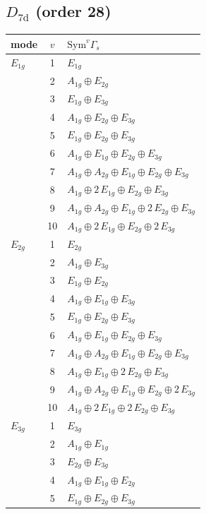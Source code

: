 \documentclass[11pt]{article}
\begin{document}
\subsection*{$D_{7\mathrm{d}}$ \quad (order 28)}
\begin{longtable}{l c p{}}
\hline mode & $v$ & $\mathrm{Sym}^v\Gamma_s$\\ \hline\endhead
$E_{1g}$ & 1 & $E_{1g}$\\
 & 2 & $A_{1g}\oplus E_{2g}$\\
 & 3 & $E_{1g}\oplus E_{3g}$\\
 & 4 & $A_{1g}\oplus E_{2g}\oplus E_{3g}$\\
 & 5 & $E_{1g}\oplus E_{2g}\oplus E_{3g}$\\
 & 6 & $A_{1g}\oplus E_{1g}\oplus E_{2g}\oplus E_{3g}$\\
 & 7 & $A_{1g}\oplus A_{2g}\oplus E_{1g}\oplus E_{2g}\oplus E_{3g}$\\
 & 8 & $A_{1g}\oplus 2\,E_{1g}\oplus E_{2g}\oplus E_{3g}$\\
 & 9 & $A_{1g}\oplus A_{2g}\oplus E_{1g}\oplus 2\,E_{2g}\oplus E_{3g}$\\
 & 10 & $A_{1g}\oplus 2\,E_{1g}\oplus E_{2g}\oplus 2\,E_{3g}$\\
\hline
$E_{2g}$ & 1 & $E_{2g}$\\
 & 2 & $A_{1g}\oplus E_{3g}$\\
 & 3 & $E_{1g}\oplus E_{2g}$\\
 & 4 & $A_{1g}\oplus E_{1g}\oplus E_{3g}$\\
 & 5 & $E_{1g}\oplus E_{2g}\oplus E_{3g}$\\
 & 6 & $A_{1g}\oplus E_{1g}\oplus E_{2g}\oplus E_{3g}$\\
 & 7 & $A_{1g}\oplus A_{2g}\oplus E_{1g}\oplus E_{2g}\oplus E_{3g}$\\
 & 8 & $A_{1g}\oplus E_{1g}\oplus 2\,E_{2g}\oplus E_{3g}$\\
 & 9 & $A_{1g}\oplus A_{2g}\oplus E_{1g}\oplus E_{2g}\oplus 2\,E_{3g}$\\
 & 10 & $A_{1g}\oplus 2\,E_{1g}\oplus 2\,E_{2g}\oplus E_{3g}$\\
\hline
$E_{3g}$ & 1 & $E_{3g}$\\
 & 2 & $A_{1g}\oplus E_{1g}$\\
 & 3 & $E_{2g}\oplus E_{3g}$\\
 & 4 & $A_{1g}\oplus E_{1g}\oplus E_{2g}$\\
 & 5 & $E_{1g}\oplus E_{2g}\oplus E_{3g}$\\

\end{longtable}
\end{document}
